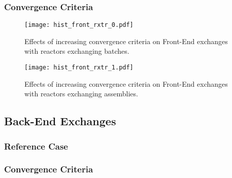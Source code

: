 
\subsubsection{Convergence Criteria}



\begin{figure}[h!]
  \begin{center}
    \texttt{[image: hist\_front\_rxtr\_0.pdf]}
    \caption[]{
      \label{fig:hist_front_rxtr_0}
      Effects of increasing convergence criteria on Front-End exchanges with
      reactors exchanging batches.  }
  \end{center}
\end{figure}

\begin{figure}[h!]
  \begin{center}
    \texttt{[image: hist\_front\_rxtr\_1.pdf]}
    \caption[]{
      \label{fig:hist_front_rxtr_1}
      Effects of increasing convergence criteria on Front-End exchanges with
      reactors exchanging assemblies.  }
  \end{center}
\end{figure}

\subsection{Back-End Exchanges}

\subsubsection{Reference Case}






\subsubsection{Convergence Criteria}
